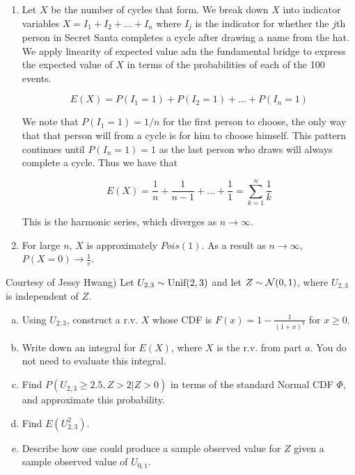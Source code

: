 \documentclass[11pt]{article}
\begin{document}
\begin{solution}
\begin{enumerate}
\item
Let $X$ be the number of cycles that form. We break down $X$ into indicator variables $X = I_1 + I_2 + ... + I_n$ where $I_j$ is the indicator for whether the $j$th person in Secret Santa completes a cycle after drawing a name from the hat.\\

We apply linearity of expected value adn the fundamental bridge to express the expected value of $X$ in terms of the probabilities of each of the 100 events.

$$E(X) = P(I_1 = 1) + P(I_2 = 1) + ... + P(I_n = 1)$$

We note that $P(I_1 = 1) = 1/n$ for the first person to choose, the only way that that person will from a cycle is for him to choose himself. This pattern continues until $P(I_n = 1) = 1$ as the last person who draws will always complete a cycle. Thus we have that

$$E(X) = \frac{1}{n} +\frac{1}{n-1} + ...+\frac{1}{1} = \sum_{k=1}^n \frac{1}{k}$$

This is the harmonic series, which diverges as $n \rightarrow \infty$.

\item For large $n$, $X$ is approximately $Pois(1)$. As a result as $n \rightarrow \infty$, $P(X = 0) \rightarrow \frac{1}{e}$.
\end{enumerate}
\end{solution}

\pagebreak

\begin{exercise}
Courtesy of Jessy Hwang) Let $U_{2, 3} \sim \textrm{Unif}(2,3)$ and let $Z \sim \mathcal{N}(0,1)$, where $U_{2, 3}$ is independent of $Z$.
 \begin{enumerate}[a)] \itemsep 1.5in
         \item Using $U_{2, 3}$, construct a r.v. $X$ whose CDF is $F(x) = 1 - \displaystyle\frac{1}{(1+x)^4}$ for $x \ge 0$.
         \item Write down an integral for $E(X)$, where $X$ is the r.v. from part $a$. You do not need to evaluate this integral.
         \item Find $P(U_{2, 3} \ge 2.5, Z > 2 | Z > 0)$ in terms of the standard Normal CDF $\Phi$, and approximate this probability.
         \item Find $E(U_{2, 3}^2)$.
         \item Describe how one could produce a sample observed value for $Z$ given a sample observed value of $U_{0, 1}$.
\end{enumerate}
\end{exercise}
\end{document}
